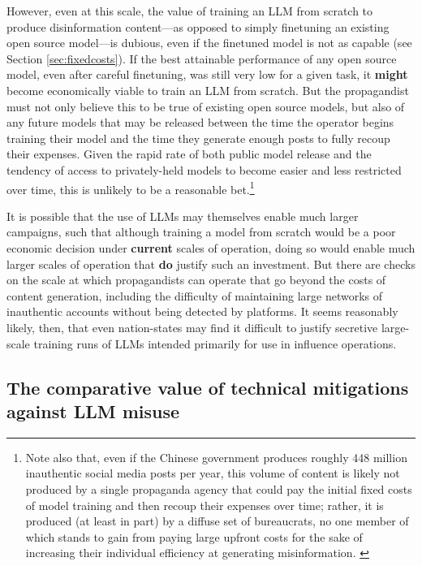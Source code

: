 \documentclass{article}
\begin{document}
However, even at this scale, the value of training an LLM from scratch to produce disinformation content—as opposed to simply finetuning an existing open source model—is dubious, even if the finetuned model is not as capable (see Section \ref{sec:fixedcosts}). If the best attainable performance of any open source model, even after careful finetuning, was still very low for a given task, it \textbf{might} become economically viable to train an LLM from scratch. But the propagandist must not only believe this to be true of existing open source models, but also of any future models that may be released between the time the operator begins training their model and the time they generate enough posts to fully recoup their expenses. Given the rapid rate of both public model release and the tendency of access to privately-held models to become easier and less restricted over time, this is unlikely to be a reasonable bet.\footnote{Note also that, even if the Chinese government produces roughly 448 million inauthentic social media posts per year, this volume of content is likely not produced by a single propaganda agency that could pay the initial fixed costs of model training and then recoup their expenses over time; rather, it is produced (at least in part) by a diffuse set of bureaucrats, no one member of which stands to gain from paying large upfront costs for the sake of increasing their individual efficiency at generating misinformation. \cite{king}} 

It is possible that the use of LLMs may themselves enable much larger campaigns, such that although training a model from scratch would be a poor economic decision under \textbf{current} scales of operation, doing so would enable much larger scales of operation that \textbf{do} justify such an investment. But there are checks on the scale at which propagandists can operate that go beyond the costs of content generation, including the difficulty of maintaining large networks of inauthentic accounts without being detected by platforms. \cite{goldsteinpanel, sedova1} It seems reasonably likely, then, that even nation-states may find it difficult to justify secretive large-scale training runs of LLMs intended primarily for use in influence operations. 

\subsection{The comparative value of technical mitigations against LLM misuse}
\end{document}
